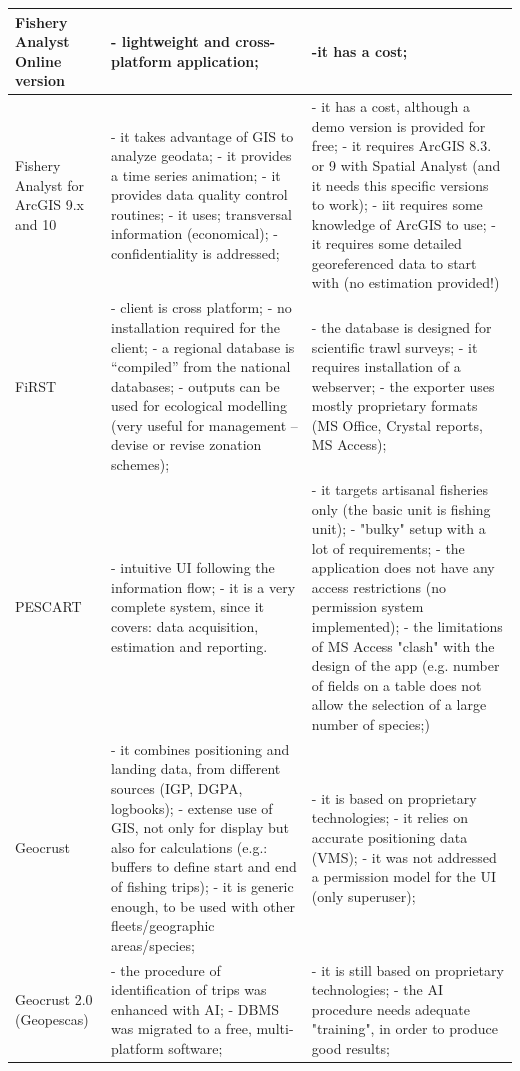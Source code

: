 \documentclass[11pt]{article} %
\begin{document}
\begin{center}
\begin{supertabular}{ | p{0.3\textwidth} | p{0.3\textwidth} | p{0.3\textwidth} |}
Fishery Analyst Online version & - lightweight and cross-platform application; & -it has a cost; \\ \hline
Fishery Analyst for ArcGIS 9.x and 10 & - it takes advantage of GIS to analyze geodata; - it provides a time series animation; - it provides data quality control routines; - it uses; transversal information (economical); - confidentiality is addressed; & - it has a cost, although a demo version is provided for free; - it requires ArcGIS 8.3. or 9 with Spatial Analyst (and it needs this specific versions to work); - iit requires some knowledge of ArcGIS to use; - it requires some detailed georeferenced data to start with (no estimation provided!) \\ \hline
FiRST & - client is cross platform; - no installation required for the client; - a regional database is “compiled” from the national databases; - outputs can be used for ecological modelling (very useful for management – devise or revise zonation schemes); & - the database is designed for scientific trawl surveys; - it requires installation of a webserver; - the exporter uses mostly proprietary formats (MS Office, Crystal reports, MS Access); \\ \hline
PESCART & - intuitive UI following the information flow; - it is a very complete system, since it covers: data acquisition, estimation and reporting. & - it targets artisanal fisheries only (the basic unit is fishing unit); - "bulky" setup with a lot of requirements; - the application does not have any access restrictions (no permission system implemented); - the limitations of MS Access "clash" with the design of the app (e.g. number of fields on a table does not allow the selection of a large number of species;) \\ \hline
Geocrust & - it combines positioning and landing data, from different sources (IGP, DGPA, logbooks); - extense use of GIS, not only for display but also for calculations (e.g.: buffers to define start and end of fishing trips); - it is generic enough, to be used with other fleets/geographic areas/species; & - it is based on proprietary technologies; - it relies on accurate positioning data (VMS); - it was not addressed a permission model for the UI (only superuser); \\ \hline
Geocrust 2.0 (Geopescas) & - the procedure of identification of trips was enhanced with AI; - DBMS was migrated to a free, multi-platform software; & - it is still based on proprietary technologies; - the AI procedure needs adequate "training", in order to produce good results; \\ \hline

\end{supertabular}
\end{center}
\end{document}
